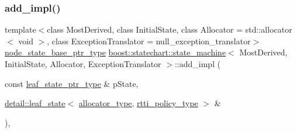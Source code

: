 \mbox{\label{classboost_1_1statechart_1_1state__machine_a1e24717585bec9141b46d1807c40f517}} 
\subsubsection{\texorpdfstring{add\+\_\+impl()}{add\_impl()}\hspace{0.1cm}{\footnotesize\ttfamily [1/2]}}
{\footnotesize\ttfamily template$<$class Most\+Derived, class Initial\+State, class Allocator = std\+::allocator$<$ void $>$, class Exception\+Translator = null\+\_\+exception\+\_\+translator$>$ \\
\mbox{\hyperlink{classboost_1_1statechart_1_1state__machine_a5d90f1176309ec8307979aa79dd6f4a3}{node\+\_\+state\+\_\+base\+\_\+ptr\+\_\+type}} \mbox{\hyperlink{classboost_1_1statechart_1_1state__machine}{boost\+::statechart\+::state\+\_\+machine}}$<$ Most\+Derived, Initial\+State, Allocator, Exception\+Translator $>$\+::add\+\_\+impl (\begin{DoxyParamCaption}\item[{const \mbox{\hyperlink{classboost_1_1statechart_1_1state__machine_a70f60d22dbc67497b1388e72e2bf6824}{leaf\+\_\+state\+\_\+ptr\+\_\+type}} \&}]{p\+State,  }\item[{\mbox{\hyperlink{classboost_1_1statechart_1_1detail_1_1leaf__state}{detail\+::leaf\+\_\+state}}$<$ \mbox{\hyperlink{classboost_1_1statechart_1_1state__machine_a7345d6567cd1a829234bbb7f6c0715da}{allocator\+\_\+type}}, \mbox{\hyperlink{classboost_1_1statechart_1_1state__machine_af2a620c579a5248103aee4d3ccb4d632}{rtti\+\_\+policy\+\_\+type}} $>$ \&}]{ }\end{DoxyParamCaption})\hspace{0.3cm}{\ttfamily [inline]}, {\ttfamily [private]}}

